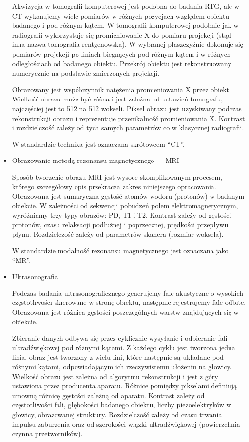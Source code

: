 \begin{itemize}
          Akwizycja w tomografii komputerowej jest podobna do badania RTG, ale w CT wykonujemy wiele pomiarów w różnych pozycjach względem obiektu badanego i pod różnym kątem.
          W tomografii komputerowej podobnie jak w radiografii wykorzystuje się promieniowanie X do pomiaru projekcji (stąd inna nazwa tomografia rentgenowska).
          W wybranej płaszczyźnie dokonuje się pomiarów projekcji po liniach biegnących pod różnym kątem i w różnych odległościach od badanego obiektu.
          Przekrój obiektu jest rekonstruowany numerycznie na podstawie zmierzonych projekcji.

          Obrazowany jest współczynnik natężenia promieniowania X przez obiekt.
          Wielkość obrazu może być różna i jest zależna od ustawień tomografu, najczęściej jest to 512 na 512 wokseli.
          Piksel obrazu jest uzyskiwany podczas rekonstrukcji obrazu i reprezentuje przenikalność promieniowania X.
          Kontrast i rozdzielczość zależy od tych samych parametrów co w klasycznej radiografii.

          W standardzie \DICOM technika jest oznaczana skrótowcem \enquote{CT}.

    \item Obrazowanie metodą rezonansu magnetycznego --- MRI

          Sposób tworzenie obrazu MRI jest wysoce skomplikowanym procesem, którego szczegółowy opis przekracza zakres niniejszego opracowania.
          Obrazowana jest sumaryczna gęstość atomów wodoru (protonów) w badanym obiekcie.
          W zależności od sekwencji pobudzeń polem elektromagnetycznym, wyróżniamy trzy typy obrazów: PD, T1 i T2.
          Kontrast zależy od gęstości protonów, czasu relaksacji podłużnej i poprzecznej, prędkości przepływu płynu.
          Rozdzielczość zależy od parametrów skanera (rozmiar woksela).

          W standardzie \DICOM modalność rezonansu magnetycznego jest oznaczana jako \enquote{MR}.

    \item Ultrasonografia

          Podczas badania ultrasonograficznego generujemy fale akustyczne o wysokich częstotliwości skierowane w stronę obiektu, następnie rejestrujemy fale odbite.
          Obrazowana jest różnica gęstości poszczególnych warstw znajdujących się w obiekcie.

          Zbieranie danych odbywa się przez cyklicznie wysyłanie i odbieranie fali ultradźwiękowej pod różnymi kątami.
          Z każdego cyklu jest tworzona jedna linia, obraz jest tworzony z wielu lini, które następnie są układane pod różnymi kątami, odpowiadającym ich rzeczywistemu ułożeniu na głowicy.
          Wielkość obrazu jest zależna od algorytmu rekonstrukcji i jest z góry ustawiona przez producenta aparatu.
          Różnice pomiędzy pikselami definiują umowną różnicę gęstości zależną od aparatu.
          Kontrast zależy od częstotliwości fali, głębokości badanego obiektu, liczby piezoelektryków w głowicy, obrazowanej struktury.
          Rozdzielczość zależy od czasu trwania impulsu zaburzenia oraz od szerokości wiązki ultradźwiękowej (powierzchnia czynna przetworników).


\end{itemize}
